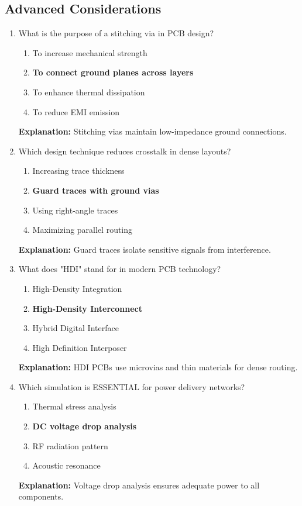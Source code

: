 \documentclass{article}
\begin{document}
	\subsection*{Advanced Considerations}
	
	\begin{enumerate}[resume]
		\item What is the purpose of a stitching via in PCB design?
		\begin{enumerate}
			\item To increase mechanical strength
			\item \textbf{To connect ground planes across layers}
			\item To enhance thermal dissipation
			\item To reduce EMI emission
		\end{enumerate}
		\textbf{Explanation:} Stitching vias maintain low-impedance ground connections.
		
		\item Which design technique reduces crosstalk in dense layouts?
		\begin{enumerate}
			\item Increasing trace thickness
			\item \textbf{Guard traces with ground vias}
			\item Using right-angle traces
			\item Maximizing parallel routing
		\end{enumerate}
		\textbf{Explanation:} Guard traces isolate sensitive signals from interference.
		
		\item What does "HDI" stand for in modern PCB technology?
		\begin{enumerate}
			\item High-Density Integration
			\item \textbf{High-Density Interconnect}
			\item Hybrid Digital Interface
			\item High Definition Interposer
		\end{enumerate}
		\textbf{Explanation:} HDI PCBs use microvias and thin materials for dense routing.
		
		\item Which simulation is ESSENTIAL for power delivery networks?
		\begin{enumerate}
			\item Thermal stress analysis
			\item \textbf{DC voltage drop analysis}
			\item RF radiation pattern
			\item Acoustic resonance
		\end{enumerate}
		\textbf{Explanation:} Voltage drop analysis ensures adequate power to all components.
		

\end{enumerate}
\end{document}
